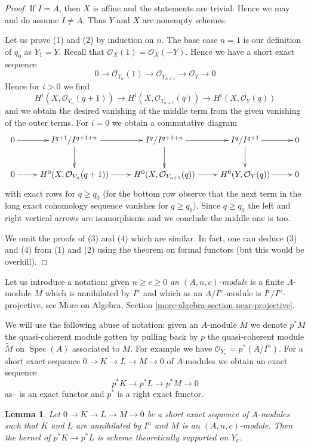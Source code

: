 \documentclass{stacks-project}
\theoremstyle{plain}
\newtheorem{lemma}[subsection]{Lemma}
\theoremstyle{definition}
\theoremstyle{remark}
\numberwithin{equation}{subsection}
\def\Spec{\mathop{\mathrm{Spec}}}
\begin{document}
\begin{proof}
If $I = A$, then $X$ is affine and the statements are trivial.
Hence we may and do assume $I \not = A$.
Thus $Y$ and $X$ are nonempty schemes.

\medskip\noindent
Let us prove (1) and (2) by induction on $n$. The base case $n = 1$
is our definition of $q_0$ as $Y_1 = Y$.
Recall that $\mathcal{O}_X(1) = \mathcal{O}_X(-Y)$.
Hence we have a short exact sequence
$$
0 \to \mathcal{O}_{Y_n}(1) \to \mathcal{O}_{Y_{n + 1}} \to \mathcal{O}_Y \to 0
$$
Hence for $i > 0$ we find
$$
H^i(X, \mathcal{O}_{Y_n}(q + 1)) \to
H^i(X, \mathcal{O}_{Y_{n + 1}}(q)) \to
H^i(X, \mathcal{O}_{Y}(q))
$$
and we obtain the desired vanishing of the middle term from the given
vanishing of the outer terms. For $i = 0$ we obtain a commutative diagram
$$
\xymatrix{
0 \ar[r] &
I^{q + 1}/I^{q + 1 + n} \ar[d] \ar[r] &
I^q/I^{q + 1 + n} \ar[d] \ar[r] &
I^q/I^{q + 1} \ar[d] \ar[r] &
0 \\
0 \ar[r] &
H^0(X, \mathcal{O}_{Y_n}(q + 1)) \ar[r] &
H^0(X, \mathcal{O}_{Y_{n + 1}}(q)) \ar[r] &
H^0(Y, \mathcal{O}_Y(q)) \ar[r] &
0
}
$$
with exact rows for $q \geq q_0$ (for the bottom row observe that
the next term in the long exact cohomology sequence vanishes for
$q \geq q_0$). Since $q \geq q_0$ the left and right vertical arrows
are isomorphisms and we conclude the middle one is too.

\medskip\noindent
We omit the proofs of (3) and (4) which are similar.
In fact, one can deduce (3) and (4) from (1) and (2)
using the theorem on formal functors (but this would be
overkill).
\end{proof}

\noindent
Let us introduce a notation: given $n \geq c \geq 0$
{\it an $(A, n, c)$-module}
is a finite $A$-module $M$ which is annihilated by $I^n$
and which as an $A/I^n$-module is $I^c/I^n$-projective, see
More on Algebra, Section \ref{more-algebra-section-near-projective}.

\medskip\noindent
We will use the following abuse of notation: given an $A$-module $M$
we denote $p^*M$ the quasi-coherent module gotten by pulling back by $p$
the quasi-coherent module $\widetilde{M}$ on $\Spec(A)$ associated to $M$.
For example we have $\mathcal{O}_{Y_n} = p^*(A/I^n)$.
For a short exact sequence $0 \to K \to L \to M \to 0$ of $A$-modules
we obtain an exact sequence
$$
p^*K \to p^*L \to p^*M \to 0
$$
as $\widetilde{\ }$ is an exact functor and $p^*$ is a right exact functor.

\begin{lemma}
\label{lemma-almost-exactness}
Let $0 \to K \to L \to M \to 0$ be a short exact sequence of $A$-modules
such that $K$ and $L$ are annihilated by $I^n$ and $M$ is an
$(A, n, c)$-module. Then the kernel of $p^*K \to p^*L$
is scheme theoretically supported on $Y_c$.
\end{lemma}
\end{document}
